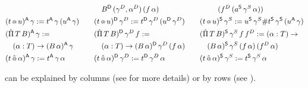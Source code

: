 \documentclass[a4paper,UKenglish,cleveref, autoref]{lipics-v2019}
\begin{document}
\begin{definition}
\begin{alignat*}{10}
    & && && \hspace{1em}  B^\D\,(\gamma^D,\alpha^D)\,(f\,\alpha) && && \hspace{1em}\hphantom{B^\S\,}(f^D\,(a^\S\,\gamma^S\,\alpha)) \\
    & (t\oldapp u)^\A\,\gamma := t^\A\,\gamma\,(u^\A\,\gamma) && &&  (t\oldapp u)^\D\,\gamma^D := t^\D\,\gamma^D\,(u^\D\,\gamma^D) && &&  (t\oldapp u)^\S\,\gamma^S := u^\S\,\gamma^S \# t^\S\,\gamma^\S\,(u^\A\,\gamma) \\
    & (\Pim\,T\,B)^\A\,\gamma := && && (\Pim\,T\,B)^\D\,\gamma^D\,f := && && (\Pim\,T\,B)^\S\,\gamma^S\,f\,f^D := (\alpha:T)\ra \\
    & \hspace{1em} (\alpha:T)\ra(B\,\alpha)^\A\,\gamma && && \hspace{1em} (\alpha:T)\ra(B\,\alpha)^\D\,\gamma^D\,(f\,\alpha) && && \hspace{1em} (B\,\alpha)^\S\,\gamma^S\,(f\,\alpha)\,(f^D\,\alpha) \\
    & (t\appm \alpha)^\A\,\gamma := t^\A\,\gamma\,\alpha && && (t\appm \alpha)^\D\,\gamma^D := t^\D\,\gamma^D\,\alpha && && (t\appm \alpha)^\S\,\gamma^S := t^\S\,\gamma^S\,\alpha
  \end{alignat*}
\end{definition}
 can be explained by columns (see
\cite[Sections 4 and 6]{Kaposi:2019:CQI:3302515.3290315} for more details) or by rows
(see \cite[Section 7.4]{Kaposi:2019:CQI:3302515.3290315}).
\end{document}
